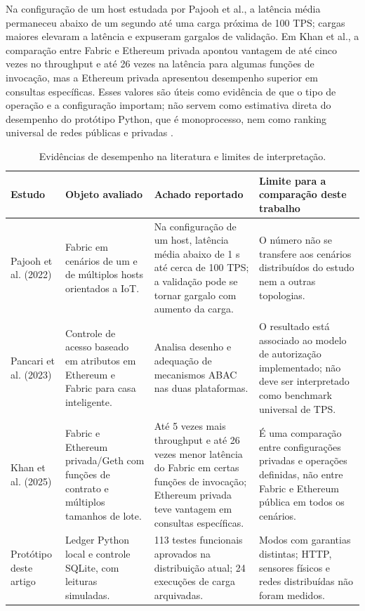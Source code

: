 \documentclass[10pt,a4paper,twocolumn]{article}
\begin{document}
Na configuração de um host estudada por Pajooh et al., a latência média permaneceu abaixo de um segundo até uma carga próxima de 100 TPS; cargas maiores elevaram a latência e expuseram gargalos de validação. Em Khan et al., a comparação entre Fabric e Ethereum privada apontou vantagem de até cinco vezes no throughput e até 26 vezes na latência para algumas funções de invocação, mas a Ethereum privada apresentou desempenho superior em consultas específicas. Esses valores são úteis como evidência de que o tipo de operação e a configuração importam; não servem como estimativa direta do desempenho do protótipo Python, que é monoprocesso, nem como ranking universal de redes públicas e privadas \cite{Pajooh2022,Khan2025}.

\begin{table}[t]
\centering\small
\caption{Evidências de desempenho na literatura e limites de interpretação.}
\label{tab:literatura-desempenho}
\begin{tabularx}{\textwidth}{p{}p{}p{}X}
\toprule
Estudo & Objeto avaliado & Achado reportado & Limite para a comparação deste trabalho \\
\midrule
Pajooh et al. (2022) & Fabric em cenários de um e de múltiplos hosts orientados a IoT. & Na configuração de um host, latência média abaixo de 1 s até cerca de 100 TPS; a validação pode se tornar gargalo com aumento da carga. & O número não se transfere aos cenários distribuídos do estudo nem a outras topologias. \\
Pancari et al. (2023) & Controle de acesso baseado em atributos em Ethereum e Fabric para casa inteligente. & Analisa desenho e adequação de mecanismos ABAC nas duas plataformas. & O resultado está associado ao modelo de autorização implementado; não deve ser interpretado como benchmark universal de TPS. \\
Khan et al. (2025) & Fabric e Ethereum privada/Geth com funções de contrato e múltiplos tamanhos de lote. & Até 5 vezes mais throughput e até 26 vezes menor latência do Fabric em certas funções de invocação; Ethereum privada teve vantagem em consultas específicas. & É uma comparação entre configurações privadas e operações definidas, não entre Fabric e Ethereum pública em todos os cenários. \\
Protótipo deste artigo & Ledger Python local e controle SQLite, com leituras simuladas. & 113 testes funcionais aprovados na distribuição atual; 24 execuções de carga arquivadas. & Modos com garantias distintas; HTTP, sensores físicos e redes distribuídas não foram medidos. \\
\bottomrule
\end{tabularx}
\end{table}
\end{document}
